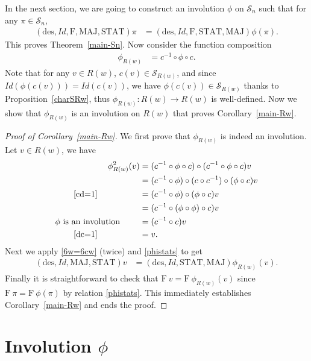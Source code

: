 \documentclass[12pt]{amsart}
\numberwithin{equation}{section}
\theoremstyle{plain}
\theoremstyle{definition}
\def\MAJ{\mathrm{MAJ}}
\def\STAT{\mathrm{STAT}}
\def\F{\mathrm{F}}
\def\des{\mathrm{des}}
\def\SS{\mathcal{S}}
\begin{document}
In the next section, we are going to construct an involution $\phi$ on $\SS_n$ such that for any $\pi\in\SS_n$,
\begin{align}\label{phistats}
(\des, Id, \F, \MAJ, \STAT)\pi &=(\des, Id, \F, \STAT, \MAJ)\phi(\pi).
\end{align}
This proves Theorem~\ref{main-Sn}. Now consider the function composition
\begin{align*}
\phi_{R(w)}&=c^{-1}\circ \phi \circ c.
\end{align*}
Note that for any $v\in R(w)$, $c(v)\in \SS_{R(w)}$, and since $Id(\phi(c(v)))=Id(c(v))$, we have $\phi(c(v))\in\SS_{R(w)}$ thanks to Proposition~\ref{charSRw}, thus $\phi_{R(w)}: R(w)\rightarrow R(w)$ is well-defined. Now we show that $\phi_{R(w)}$ is an involution on $R(w)$ that proves Corollary~\ref{main-Rw}.
\begin{proof}[Proof of Corollary~\ref{main-Rw}]
We first prove that $\phi_{R(w)}$ is indeed an involution. Let $v\in R(w)$, we have
\begin{align*}
\phi_{R(w)}^2(v)&=(c^{-1}\circ \phi \circ c)\circ(c^{-1}\circ \phi \circ c)v\\
&=(c^{-1}\circ \phi)\circ(c\circ c^{-1})\circ(\phi \circ c)v\\
\text{\eqref{cd=1}}\qquad\qquad\quad &=(c^{-1}\circ \phi)\circ(\phi \circ c)v\\
&=(c^{-1}\circ(\phi\circ\phi)\circ c)v\\
\phi \text{ is an involution }\quad\quad &=(c^{-1}\circ c)v\\
\text{\eqref{dc=1}} \qquad \qquad \quad &=v.
\end{align*}
Next we apply \eqref{6w=6cw} (twice) and \eqref{phistats} to get
\begin{align*}
(\des, Id, \MAJ, \STAT)v &=(\des, Id, \STAT, \MAJ)\phi_{R(w)}(v).
\end{align*}
Finally it is straightforward to check that $\F~v=\F~\phi_{R(w)}(v)$ since $\F~\pi=\F~\phi(\pi)$ by relation \eqref{phistats}. This immediately establishes Corollary~\ref{main-Rw} and ends the proof.
\end{proof}




\section{Involution $\phi$}\label{sec:involution}
\end{document}
